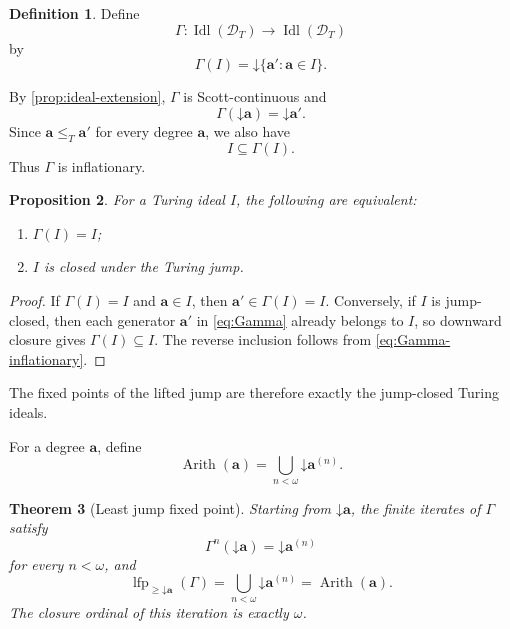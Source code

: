 \documentclass[11pt]{article}
\newtheorem{theorem}{Theorem}[section]
\newtheorem{proposition}[theorem]{Proposition}
\theoremstyle{definition}
\newtheorem{definition}[theorem]{Definition}
\theoremstyle{remark}
\newcommand{\DT}{\mathcal D_T}
\newcommand{\Idl}{\operatorname{Idl}}
\newcommand{\lfp}{\operatorname{lfp}}
\newcommand{\down}{\mathord{\downarrow}}
\newcommand{\leT}{\leq_T}
\begin{document}
\begin{definition}
Define
\[
\Gamma:\Idl(\DT)\longrightarrow\Idl(\DT)
\]
by
\begin{equation}
\Gamma(I)=\down\{\mathbf a':\mathbf a\in I\}.
\label{eq:Gamma}
\end{equation}
\end{definition}

By \cref{prop:ideal-extension}, $\Gamma$ is Scott-continuous and
\begin{equation}
\Gamma(\down\mathbf a)=\down\mathbf a'.
\label{eq:Gamma-principal}
\end{equation}
Since $\mathbf a\leT\mathbf a'$ for every degree $\mathbf a$, we also have
\begin{equation}
I\subseteq\Gamma(I).
\label{eq:Gamma-inflationary}
\end{equation}
Thus $\Gamma$ is inflationary.

\begin{proposition}
\label{prop:jump-ideal}
For a Turing ideal $I$, the following are equivalent:
\begin{enumerate}
\item $\Gamma(I)=I$;
\item $I$ is closed under the Turing jump.
\end{enumerate}
\end{proposition}

\begin{proof}
If $\Gamma(I)=I$ and $\mathbf a\in I$, then
$\mathbf a'\in\Gamma(I)=I$. Conversely, if $I$ is jump-closed, then each generator $\mathbf a'$ in \eqref{eq:Gamma} already belongs to $I$, so downward closure gives $\Gamma(I)\subseteq I$. The reverse inclusion follows from \eqref{eq:Gamma-inflationary}.
\end{proof}

The fixed points of the lifted jump are therefore exactly the jump-closed Turing ideals.

For a degree $\mathbf a$, define
\begin{equation}
\operatorname{Arith}(\mathbf a)
=
\bigcup_{n<\omega}\down\mathbf a^{(n)}.
\label{eq:arith-a}
\end{equation}

\begin{theorem}[Least jump fixed point]
\label{thm:least-jump-fixed}
Starting from $\down\mathbf a$, the finite iterates of $\Gamma$ satisfy
\begin{equation}
\Gamma^n(\down\mathbf a)=\down\mathbf a^{(n)}
\label{eq:finite-iterates}
\end{equation}
for every $n<\omega$, and
\begin{equation}
\lfp_{\geq\down\mathbf a}(\Gamma)
=
\bigcup_{n<\omega}\down\mathbf a^{(n)}
=
\operatorname{Arith}(\mathbf a).
\label{eq:relative-lfp}
\end{equation}
The closure ordinal of this iteration is exactly $\omega$.
\end{theorem}
\end{document}
